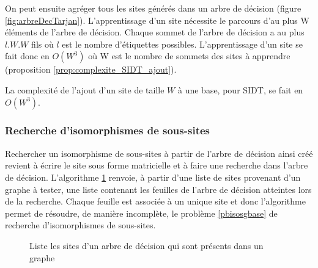 On peut ensuite agréger tous les sites générés dans un arbre de décision (figure \ref{fig:arbreDecTarjan}).
L'apprentissage d'un site nécessite le parcours d'au plus W éléments de l'arbre de décision. Chaque sommet de l'arbre de décision a au plus $l.W.W$ fils où $l$ est le nombre d'étiquettes possibles. L'apprentissage d'un site se fait donc en $O(W^3)$ où W est le nombre de sommets des sites à apprendre (proposition \ref{prop:complexite_SIDT_ajout}).

\begin{prop}
 La complexité de l'ajout d'un site de taille $W$ à une base, pour SIDT, se fait en $O(W^3)$.
\label{prop:complexite_SIDT_ajout}
\end{prop}

\FloatBarrier
\subsubsection{Recherche d'isomorphismes de sous-sites}
Rechercher un isomorphisme de sous-sites à partir de l'arbre de décision ainsi créé revient à écrire le site sous forme matricielle et à faire une recherche dans l'arbre de décision. L'algorithme \ref{algo:sidt} renvoie, à partir d'une liste de sites provenant d'un graphe à tester, une liste contenant les feuilles de l'arbre de décision atteintes lors de la recherche. Chaque feuille est associée à un unique site et donc l'algorithme permet de résoudre, de manière incomplète, le problème \ref{pbisosgbase} de recherche d'isomorphismes de sous-sites.

\begin{figure}[h]
\begin{algorithm}[H] %
\caption{Liste les sites d'un arbre de décision qui sont présents dans un graphe}
\SetAlgoLined
{}

\label{algo:sidt}
\end{algorithm}
\end{figure}

